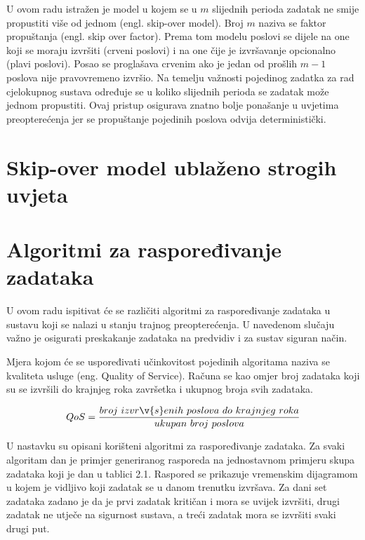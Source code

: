\documentclass[../zavrsni.tex]{subfiles}
\begin{document}
U ovom radu istražen je model u kojem se u $m$ slijednih perioda zadatak ne smije propustiti više od jednom (engl. skip-over model).
Broj $m$ naziva se faktor propuštanja (engl. skip over factor).
Prema tom modelu 
poslovi se dijele na one koji se moraju izvršiti (crveni poslovi) i na one čije je izvršavanje opcionalno (plavi poslovi). Posao se proglašava crvenim 
ako je jedan od prošlih $m-1$ poslova nije pravovremeno izvršio.
Na temelju važnosti pojedinog zadatka za rad cjelokupnog sustava određuje se u koliko slijednih perioda 
se zadatak može jednom propustiti. Ovaj pristup osigurava znatno bolje ponašanje u uvjetima preopterećenja jer se propuštanje
pojedinih poslova odvija deterministički.

\section{Skip-over model ublaženo strogih uvjeta}

\section{Algoritmi za raspoređivanje zadataka}

U ovom radu ispitivat će se različiti algoritmi za raspoređivanje zadataka u sustavu koji se nalazi u stanju trajnog preopterećenja.
U navedenom slučaju važno je osigurati preskakanje zadataka na predvidiv i za sustav siguran način.

Mjera kojom će se uspoređivati učinkovitost pojedinih algoritama naziva se kvaliteta usluge (eng. Quality of Service).
Računa se kao omjer broj zadataka koji su se izvršili do krajnjeg roka završetka i ukupnog broja svih zadataka.

\begin{equation*}
    QoS = \frac{broj\ izvr\v{s}enih\ poslova\ do\ krajnjeg\ roka}{ukupan\ broj\ poslova}
\end{equation*}

U nastavku su opisani korišteni algoritmi za raspoređivanje zadataka.
Za svaki algoritam dan je primjer generiranog rasporeda na jednostavnom primjeru skupa zadataka koji je dan u tablici 2.1. 
Raspored se prikazuje vremenskim dijagramom u kojem
je vidljivo koji zadatak se u danom trenutku izvršava. 
Za dani set zadataka zadano je da je prvi
zadatak kritičan i mora se uvijek izvršiti, drugi zadatak ne utječe na sigurnost sustava, a treći zadatak mora se izvršiti svaki drugi put.
\end{document}
